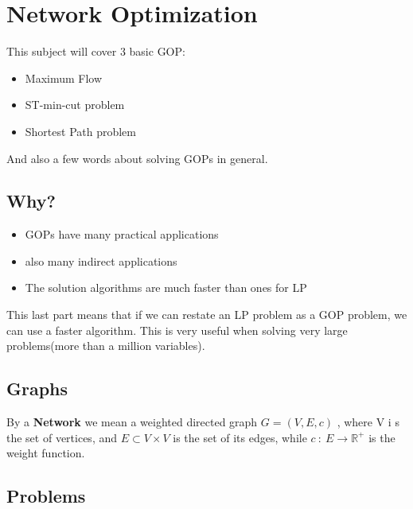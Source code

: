 \chapter{Network Optimization}
This subject will cover 3 basic GOP:
\begin{itemize}
        \item Maximum Flow\
        \item ST-min-cut problem
        \item Shortest Path problem
        
\end{itemize}
And also a few words about solving GOPs in general.
\section{Why?}
\begin{itemize}
        \item GOPs have many practical applications
        \item also many indirect applications
        \item The solution algorithms are much faster than ones for LP
        
\end{itemize}
This last part means that if we can restate an LP problem as a GOP problem, we can use a 
faster algorithm. This is very useful when solving very large problems(more than a million variables).
\section{Graphs}
{
    By a \textbf{Network} we mean a weighted directed graph $G = (V,E,c)$ , where V i s the set of vertices, and $E\subset V\times V$ is the set of its edges,
    while $c \::\: E \rightarrow \mathbb{R}^{+}$ is the weight function.
}

\section{Problems}
